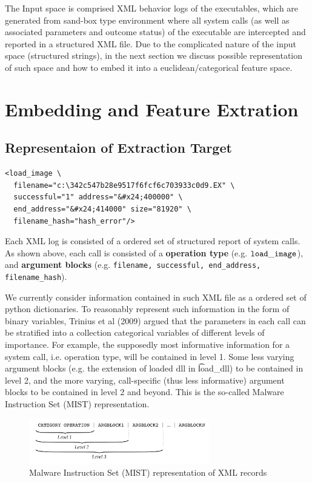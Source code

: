 \documentclass[11pt]{article}
\theoremstyle{definition}
\begin{document}
The Input space is comprised XML behavior logs of the executables, which are generated from sand-box type environment where all system calls (as well as  associated parameters and outcome status) of the executable are intercepted and reported in a structured XML file.  Due to the complicated nature of the input space (structured strings), in the next section we discuss possible representation of such space and how to embed it into a euclidean/categorical feature space.


\section{\textbf{Embedding and Feature Extration}}

\subsection{\textbf{Representaion of Extraction Target}}

\begin{lstlisting}
<load_image \
  filename="c:\342c547b28e9517f6fcf6c703933c0d9.EX" \
  successful="1" address="&#x24;400000" \
  end_address="&#x24;414000" size="81920" \
  filename_hash="hash_error"/>
\end{lstlisting}

Each XML log is consisted of a ordered set of structured report of system calls. As shown above, each call is consisted of a \textbf{operation type} (e.g. ${\tt load\_image}$), and \textbf{argument blocks} (e.g. {\tt filename, successful, end\_address, filename\_hash}). 

We currently consider information contained in such XML file as a ordered set of python dictionaries. To reasonably represent such information in the form of binary variables, Trinius et al (2009) argued that the parameters in each call can be stratified into a collection categorical variables of different levels of importance. For example, the supposedly most informative information for a system call, i.e. operation type, will be contained in level 1. Some less varying  argument blocks (e.g. the extension of loaded dll in {\t load\_dll}) to be contained in level 2, and the more varying, call-specific  (thus less informative) argument blocks to be contained in level 2 and beyond. This is the so-called Malware Instruction Set (MIST) representation.

\begin{figure}[!h]
    \centering
    \includegraphics[width=0.7\textwidth]{"./plots/MIST"}
    \caption{Malware Instruction Set (MIST) representation of XML records}
    \label{fig:awesome_image}
\end{figure}
\end{document}

